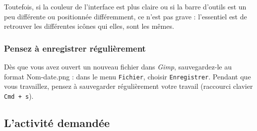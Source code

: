 Toutefois, si la couleur de l'interface est plus claire ou si la barre d'outils est un peu différente ou positionnée différemment, ce n'est pas grave : l'essentiel est de retrouver les différentes icônes qui elles, sont les mêmes.

\subsubsection{Pensez à enregistrer régulièrement}

Dès que vous avez ouvert un nouveau fichier dans \emph{Gimp}, sauvegardez-le au format Nom-date.png : dans le menu \texttt{Fichier}, choisir \texttt{Enregistrer}. Pendant que vous travaillez, pensez à sauvegarder régulièrement votre travail (raccourci clavier \texttt{Cmd + s}).   


\vfill
\phantom{rien}

\subsection{L'activité demandée}

\vspace{10pt}


